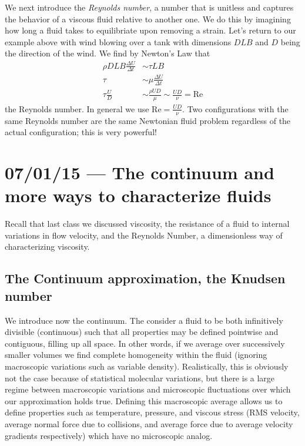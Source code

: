 \documentclass[10pt]{report}
\begin{document}
We next introduce the \emph{Reynolds number}, a number that is unitless and captures the behavior of a viscous fluid relative to another one. We do this by imagining how long a fluid takes to equilibriate upon removing a strain. Let's return to our example above with wind blowing over a tank with dimensions $DLB$ and $D$ being the direction of the wind. We find by Newton's Law that
\begin{align}
    \rho DLB \frac{\Delta U}{\Delta t} &\sim \tau LB\\
    \tau &\sim \mu \frac{\Delta U}{\Delta t}\\
    \tau \frac{U}{D} &\sim \frac{\rho UD}{\mu}\sim \frac{UD}{\nu}  = \mathrm{Re}
\end{align}
the Reynolds number. In general we use $\mathrm{Re} = \frac{UD}{\nu}$. Two configurations with the same Reynolds number are the same Newtonian fluid problem regardless of the actual configuration; this is very powerful!

\chapter{07/01/15 --- The continuum and more ways to characterize fluids}

Recall that last class we discussed viscosity, the resistance of a fluid to internal variations in flow velocity, and the Reynolds Number, a dimensionless way of characterizing viscosity.

\section{The Continuum approximation, the Knudsen number}

We introduce now the continuum. The consider a fluid to be both infinitively divisible (continuous) such that all properties may be defined pointwise and contiguous, filling up all space. In other words, if we average over successively smaller volumes we find complete homogeneity within the fluid (ignoring macroscopic variations such as variable density). Realistically, this is obviously not the case because of statistical molecular variations, but there is a large regime between macroscopic variations and microscopic fluctuations over which our approximation holds true. Defining this macroscopic average allows us to define properties such as temperature, pressure, and viscous stress (RMS velocity, average normal force due to collisions, and average force due to average velocity gradients respectively) which have no microscopic analog.
\end{document}
